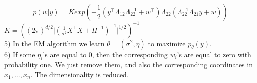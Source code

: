 \documentclass[11pt,a4paper]{article}
\begin{document}
$$ p(w\vert y) = K exp \left( - \frac{1}{2} ( y^{\top} \Lambda_{12} \Lambda_{22}^{-1} + w^{\top})\Lambda_{22}(\Lambda_{22}^{-1}\Lambda_{21}y + w ) \right)$$
$K = \left( (2\pi)^{d/2} \vert ( \frac{1}{\sigma^2} X^{\top}X + H^{-1})^{-1}\vert^{1/2} \right) ^{-1}$
%
%
\\[5mm]5) In the EM algorithm we learn $\theta = (\sigma^2, \eta)$ to maximize $p_\theta(y)$.
%
%
\\[5mm]6) If some $\eta_i$'s are equal to 0, then the corresponding $w_i$'s are equal to zero with probability one. We just remove them, and also the corresponding coordinates in $x_1, \ldots, x_n$. The dimensionality is reduced.
\end{document}
